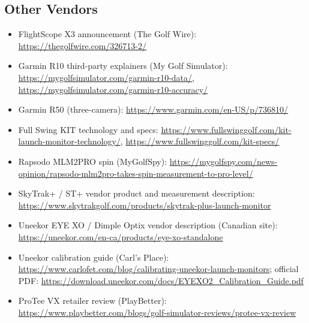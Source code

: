 \subsection*{Other Vendors}
\begin{itemize}\small
\item FlightScope X3 announcement (The Golf Wire):
  \url{https://thegolfwire.com/326713-2/}
\item Garmin R10 third-party explainers (My Golf Simulator):
  \url{https://mygolfsimulator.com/garmin-r10-data/},
  \url{https://mygolfsimulator.com/garmin-r10-accuracy/}
\item Garmin R50 (three-camera):
  \url{https://www.garmin.com/en-US/p/736810/}
\item Full Swing KIT technology and specs:
  \url{https://www.fullswinggolf.com/kit-launch-monitor-technology/},
  \url{https://www.fullswinggolf.com/kit-specs/}
\item Rapsodo MLM2PRO spin (MyGolfSpy):
  \url{https://mygolfspy.com/news-opinion/rapsodo-mlm2pro-takes-spin-measurement-to-pro-level/}
\item SkyTrak+ / ST+ vendor product and measurement description:
  \url{https://www.skytrakgolf.com/products/skytrak-plus-launch-monitor}
\item Uneekor EYE XO / Dimple Optix vendor description (Canadian site):
  \url{https://uneekor.com/en-ca/products/eye-xo-standalone}
\item Uneekor calibration guide (Carl's Place):
  \url{https://www.carlofet.com/blog/calibrating-uneekor-launch-monitors};
  official PDF:
  \url{https://download.uneekor.com/docs/EYEXO2_Calibration_Guide.pdf}
\item ProTee VX retailer review (PlayBetter):
  \url{https://www.playbetter.com/blogs/golf-simulator-reviews/protee-vx-review}
\end{itemize}

